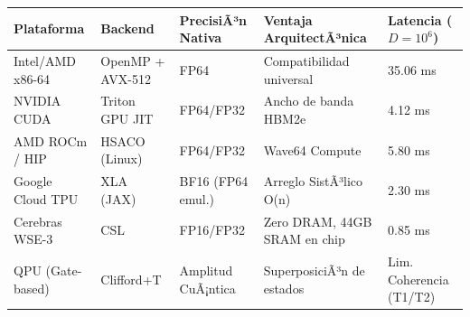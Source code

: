 \centering
\begin{tabular}{|l|l|l|l|l|}
\hline
\textbf{Plataforma} & \textbf{Backend} & \textbf{PrecisiÃ³n Nativa} & \textbf{Ventaja ArquitectÃ³nica} & \textbf{Latencia (\(D=10^6\))} \\ \hline
Intel/AMD x86-64    & OpenMP + AVX-512 & FP64                      & Compatibilidad universal        & 35.06 ms                      \\ \hline
NVIDIA CUDA         & Triton GPU JIT   & FP64/FP32                 & Ancho de banda HBM2e            & 4.12 ms                       \\ \hline
AMD ROCm / HIP      & HSACO (Linux)    & FP64/FP32                 & Wave64 Compute                  & 5.80 ms                       \\ \hline
Google Cloud TPU    & XLA (JAX)        & BF16 (FP64 emul.)         & Arreglo SistÃ³lico O(n)          & 2.30 ms                       \\ \hline
Cerebras WSE-3      & CSL              & FP16/FP32                 & Zero DRAM, 44GB SRAM en chip    & 0.85 ms                       \\ \hline
QPU (Gate-based)    & Clifford+T       & Amplitud CuÃ¡ntica         & SuperposiciÃ³n de estados        & Lim. Coherencia (T1/T2)       \\ \hline
\end{tabular}


